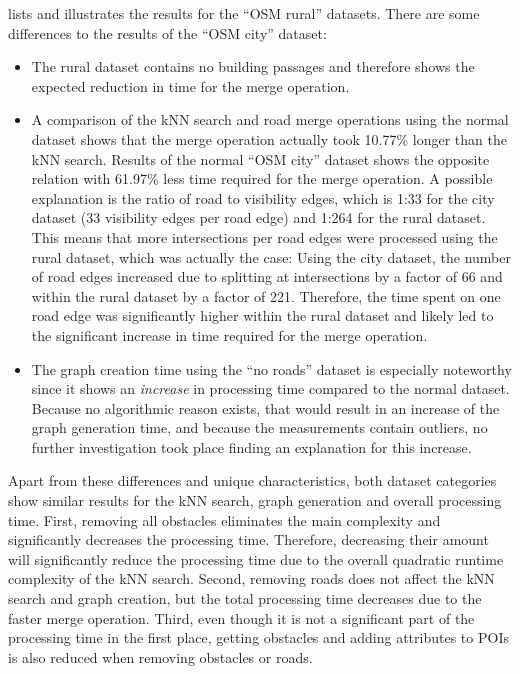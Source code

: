			\noindent
			 lists and illustrates the results for the \enquote{OSM rural} datasets.
			There are some differences to the results of the \enquote{OSM city} dataset:
			\begin{itemize}
				\item The rural dataset contains no building passages and therefore shows the expected reduction in time for the merge operation.
				\item A comparison of the kNN search and road merge operations using the normal dataset shows that the merge operation actually took 10.77\% longer than the kNN search.
				Results of the normal \enquote{OSM city} dataset shows the opposite relation with 61.97\% less time required for the merge operation.
				A possible explanation is the ratio of road to visibility edges, which is 1:33 for the city dataset (33 visibility edges per road edge) and 1:264 for the rural dataset.
				This means that more intersections per road edges were processed using the rural dataset, which was actually the case:
				Using the city dataset, the number of road edges increased due to splitting at intersections by a factor of 66 and within the rural dataset by a factor of 221.
				Therefore, the time spent on one road edge was significantly higher within the rural dataset and likely led to the significant increase in time required for the merge operation.
				\item The graph creation time using the \enquote{no roads} dataset is especially noteworthy since it shows an \emph{increase} in processing time compared to the normal dataset.
				Because no algorithmic reason exists, that would result in an increase of the graph generation time, and because the measurements contain outliers, no further investigation took place finding an explanation for this increase.
			\end{itemize}
			Apart from these differences and unique characteristics, both dataset categories show similar results for the kNN search, graph generation and overall processing time.
			First, removing all obstacles eliminates the main complexity and significantly decreases the processing time.
			Therefore, decreasing their amount will significantly reduce the processing time due to the overall quadratic runtime complexity of the kNN search.
			Second, removing roads does not affect the kNN search and graph creation, but the total processing time decreases due to the faster merge operation.
			Third, even though it is not a significant part of the processing time in the first place, getting obstacles and adding attributes to POIs is also reduced when removing obstacles or roads.
	
